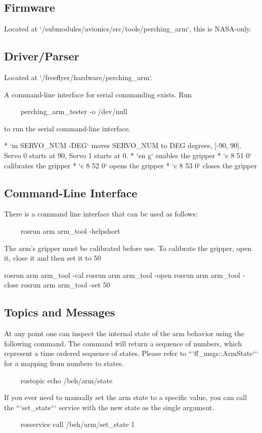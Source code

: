 \documentclass{article}
\begin{document}
\subsection{Firmware}
\begin{markdown}
Located at `/submodules/avionics/src/tools/perching_arm`, this is NASA-only.
\end{markdown}

\subsection{Driver/Parser}
\begin{markdown}
Located at `/freeflyer/hardware/perching_arm`.

A command-line interface for serial commanding exists. Run 

~~~~
perching_arm_tester -o /dev/null
~~~~

to run the serial command-line interface.

* `m SERVO_NUM -DEG` moves SERVO_NUM to DEG degrees, [-90, 90]. Servo 0 starts at 90, Servo 1 starts at 0.
* `en g` enables the gripper
* `c 8 51 0` calibrates the gripper
* `c 8 52 0` opens the gripper
* `c 8 53 0` closes the gripper
\end{markdown}

\subsection{Command-Line Interface}
\begin{markdown}
There is a command line interface that can be used as follows:

~~~~
rosrun arm arm_tool -helpshort
~~~~

The arm's gripper must be calibrated before use. To calibrate the gripper, open it, close it and then set it to 50%

    rosrun arm arm_tool -cal
    rosrun arm arm_tool -open
    rosrun arm arm_tool -close
    rosrun arm arm_tool -set 50
\end{markdown}


\subsection{Topics and Messages}

\begin{markdown}
At any point one can inspect the internal state of the arm behavior using the following command. The command will return a sequence of numbers, which represent a time ordered sequence of states. Please refer to ```ff_msgs::ArmState``` for a mapping from numbers to states.

~~~~
rostopic echo /beh/arm/state
~~~~

If you ever need to manually set the arm state to a specific value, you can call the ```set_state``` service with the new state as the single argument.

~~~~
rosservice call /beh/arm/set_state 1
~~~~
\end{markdown}
\end{document}
